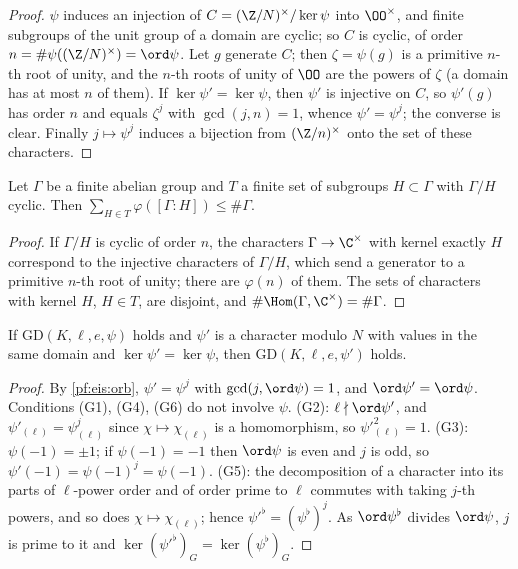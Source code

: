 \begin{proof}
$\psi$ induces an injection of $C=(\Z/N)^\times/\ker\psi$ into $\OO^\times$, and finite subgroups of the unit group of a
domain are cyclic; so $C$ is cyclic, of order $n=\#\psi((\Z/N)^\times)=\ord\psi$. Let $g$ generate $C$; then $\zeta=\psi(g)$
is a primitive $n$-th root of unity, and the $n$-th roots of unity of $\OO$ are the powers of $\zeta$ (a domain has at
most $n$ of them). If $\ker\psi'=\ker\psi$, then $\psi'$ is injective on $C$, so $\psi'(g)$ has order $n$ and equals
$\zeta^j$ with $\gcd(j,n)=1$, whence $\psi'=\psi^j$; the converse is clear. Finally $j\mapsto\psi^j$ induces a bijection
from $(\Z/n)^\times$ onto the set of these characters.
\end{proof}

\begin{lemma}\label{pf:eis:orbsum}
Let $\Gamma$ be a finite abelian group and $T$ a finite set of subgroups $H\subset\Gamma$ with $\Gamma/H$ cyclic. Then
$\sum_{H\in T}\varphi([\Gamma:H])\le\#\Gamma$.
\end{lemma}

\begin{proof}
If $\Gamma/H$ is cyclic of order $n$, the characters $\Gamma\to\C^\times$ with kernel exactly $H$ correspond to the
injective characters of $\Gamma/H$, which send a generator to a primitive $n$-th root of unity; there are $\varphi(n)$ of
them. The sets of characters with kernel $H$, $H\in T$, are disjoint, and $\#\Hom(\Gamma,\C^\times)=\#\Gamma$.
\end{proof}

\begin{lemma}\label{pf:eis:gdorb}
If $\mathrm{GD}(K,\ell,e,\psi)$ holds and $\psi'$ is a character modulo $N$ with values in the same domain and
$\ker\psi'=\ker\psi$, then $\mathrm{GD}(K,\ell,e,\psi')$ holds.
\end{lemma}

\begin{proof}
By \cref{pf:eis:orb}, $\psi'=\psi^j$ with $\gcd(j,\ord\psi)=1$, and $\ord\psi'=\ord\psi$. Conditions (G1), (G4), (G6) do not
involve $\psi$. (G2): $\ell\nmid\ord\psi'$, and $\psi'_{(\ell)}=\psi_{(\ell)}^j$ since $\chi\mapsto\chi_{(\ell)}$ is a
homomorphism, so $\psi'^2_{(\ell)}=1$. (G3): $\psi(-1)=\pm1$; if $\psi(-1)=-1$ then $\ord\psi$ is even and $j$ is odd, so
$\psi'(-1)=\psi(-1)^j=\psi(-1)$. (G5): the decomposition of a character into its parts of $\ell$-power order and of order
prime to $\ell$ commutes with taking $j$-th powers, and so does $\chi\mapsto\chi_{(\ell)}$; hence
$\psi'^\flat=(\psi^\flat)^j$. As $\ord\psi^\flat$ divides $\ord\psi$, $j$ is prime to it and $\ker(\psi'^\flat)_G=\ker(\psi^\flat)_G$.
\end{proof}

